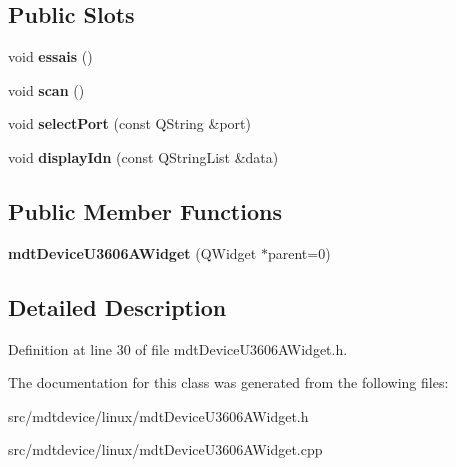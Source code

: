 \subsection*{Public Slots}
\begin{DoxyCompactItemize}
\item 
\hypertarget{classmdt_device_u3606_a_widget_aa232cf25e8ac0dee00cde5089af623b0}{
void {\bfseries essais} ()}
\label{classmdt_device_u3606_a_widget_aa232cf25e8ac0dee00cde5089af623b0}

\item 
\hypertarget{classmdt_device_u3606_a_widget_abc2b2860e71a9c79af6697205ead2a84}{
void {\bfseries scan} ()}
\label{classmdt_device_u3606_a_widget_abc2b2860e71a9c79af6697205ead2a84}

\item 
\hypertarget{classmdt_device_u3606_a_widget_a15409aed9aa73929b64be63db9f31f8e}{
void {\bfseries selectPort} (const QString \&port)}
\label{classmdt_device_u3606_a_widget_a15409aed9aa73929b64be63db9f31f8e}

\item 
\hypertarget{classmdt_device_u3606_a_widget_a3e979d85d5e198a97b36b4956d06ce8e}{
void {\bfseries displayIdn} (const QStringList \&data)}
\label{classmdt_device_u3606_a_widget_a3e979d85d5e198a97b36b4956d06ce8e}

\end{DoxyCompactItemize}
\subsection*{Public Member Functions}
\begin{DoxyCompactItemize}
\item 
\hypertarget{classmdt_device_u3606_a_widget_a653d85749d67555d8c3a43a779b6d2a2}{
{\bfseries mdtDeviceU3606AWidget} (QWidget $\ast$parent=0)}
\label{classmdt_device_u3606_a_widget_a653d85749d67555d8c3a43a779b6d2a2}

\end{DoxyCompactItemize}


\subsection{Detailed Description}


Definition at line 30 of file mdtDeviceU3606AWidget.h.



The documentation for this class was generated from the following files:\begin{DoxyCompactItemize}
\item 
src/mdtdevice/linux/mdtDeviceU3606AWidget.h\item 
src/mdtdevice/linux/mdtDeviceU3606AWidget.cpp\end{DoxyCompactItemize}
